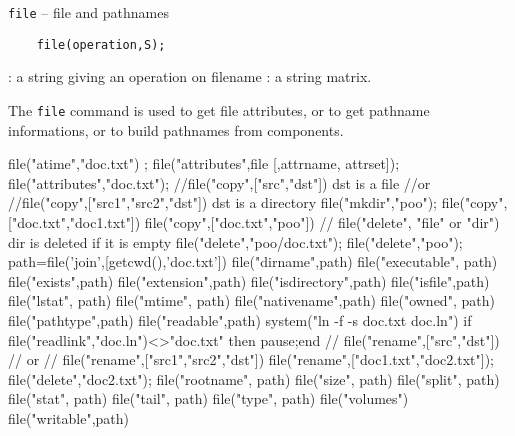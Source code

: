 \begin{mandesc}
  \texttt{file} -- file and pathnames \\ %
\end{mandesc}
\label{file}
\begin{calling_sequence}
  \begin{verbatim}
    file(operation,S);
  \end{verbatim}
\end{calling_sequence}
\begin{parameters}
  \begin{varlist}
    : a string giving an operation on filename
    : a string matrix.
  \end{varlist}
\end{parameters}
\begin{mandescription}
  The \verb!file! command is used to get file attributes, or 
  to get pathname informations, or to build pathnames from 
  components.
\end{mandescription}
\begin{examples}
  \begin{program}
    file("atime","doc.txt") ;
    file("attributes",file [,attrname, attrset]);
    file("attributes","doc.txt");
    //file("copy",["src","dst"])	    dst is a file 
    //or 
    //file("copy",["src1","src2","dst"])  dst is a directory 
    file("mkdir","poo");
    file("copy",["doc.txt","doc1.txt"]) 
    file("copy",["doc.txt","poo"]) 
    // file("delete", "file" or "dir")     dir is deleted if it is empty 
    file("delete","poo/doc.txt");
    file("delete","poo");
    path=file('join',[getcwd(),'doc.txt'])
    file("dirname",path)
    file("executable", path)
    file("exists",path)
    file("extension",path)
    file("isdirectory",path)
    file("isfile",path) 
    file("lstat", path) 
    file("mtime", path) 
    file("nativename",path)
    file("owned", path)
    file("pathtype",path) 
    file("readable",path) 
    system("ln -f -s doc.txt doc.ln")
    if file("readlink","doc.ln")<>"doc.txt" then pause;end
    // file("rename",["src","dst"])
    // or 
    // file("rename",["src1","src2","dst"])
    file("rename",["doc1.txt","doc2.txt"]);
    file("delete","doc2.txt");
    file("rootname", path)
    file("size", path)
    file("split", path)
    file("stat", path)
    file("tail", path)
    file("type", path)
    file("volumes")
    file("writable",path)
  \end{program}
\end{examples}
\begin{manseealso}
\end{manseealso}

